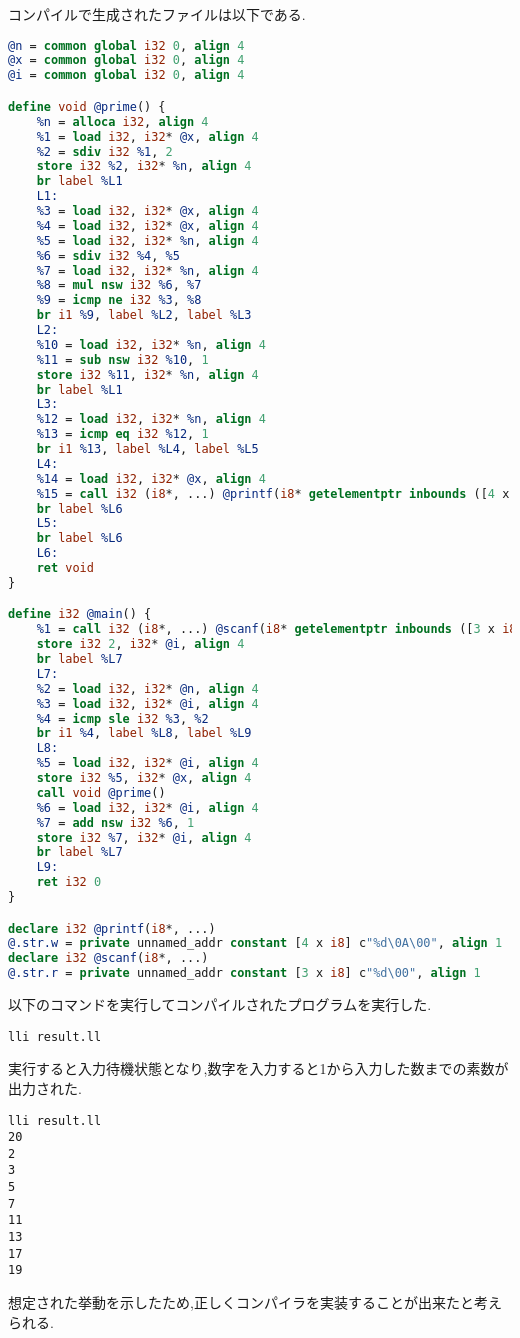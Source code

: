 \documentclass[main]{subfiles}
\begin{document}
コンパイルで生成されたファイルは以下である.
\begin{lstlisting}[caption=pl0b.pのコンパイルで生成されたresult.ll,language=LLVM]
@n = common global i32 0, align 4
@x = common global i32 0, align 4
@i = common global i32 0, align 4

define void @prime() {
    %n = alloca i32, align 4
    %1 = load i32, i32* @x, align 4
    %2 = sdiv i32 %1, 2
    store i32 %2, i32* %n, align 4
    br label %L1
    L1:
    %3 = load i32, i32* @x, align 4
    %4 = load i32, i32* @x, align 4
    %5 = load i32, i32* %n, align 4
    %6 = sdiv i32 %4, %5
    %7 = load i32, i32* %n, align 4
    %8 = mul nsw i32 %6, %7
    %9 = icmp ne i32 %3, %8
    br i1 %9, label %L2, label %L3
    L2:
    %10 = load i32, i32* %n, align 4
    %11 = sub nsw i32 %10, 1
    store i32 %11, i32* %n, align 4
    br label %L1
    L3:
    %12 = load i32, i32* %n, align 4
    %13 = icmp eq i32 %12, 1
    br i1 %13, label %L4, label %L5
    L4:
    %14 = load i32, i32* @x, align 4
    %15 = call i32 (i8*, ...) @printf(i8* getelementptr inbounds ([4 x i8], [4 x i8]* @.str.w, i64 0, i64 0), i32 %14)
    br label %L6
    L5:
    br label %L6
    L6:
    ret void
}

define i32 @main() {
    %1 = call i32 (i8*, ...) @scanf(i8* getelementptr inbounds ([3 x i8], [3 x i8]* @.str.r, i64 0, i64 0), i32* @n)
    store i32 2, i32* @i, align 4
    br label %L7
    L7:
    %2 = load i32, i32* @n, align 4
    %3 = load i32, i32* @i, align 4
    %4 = icmp sle i32 %3, %2
    br i1 %4, label %L8, label %L9
    L8:
    %5 = load i32, i32* @i, align 4
    store i32 %5, i32* @x, align 4
    call void @prime()
    %6 = load i32, i32* @i, align 4
    %7 = add nsw i32 %6, 1
    store i32 %7, i32* @i, align 4
    br label %L7
    L9:
    ret i32 0
}

declare i32 @printf(i8*, ...)
@.str.w = private unnamed_addr constant [4 x i8] c"%d\0A\00", align 1
declare i32 @scanf(i8*, ...)
@.str.r = private unnamed_addr constant [3 x i8] c"%d\00", align 1
\end{lstlisting}
以下のコマンドを実行してコンパイルされたプログラムを実行した.
\begin{oframed}
\begin{verbatim}
lli result.ll
\end{verbatim}
\end{oframed}
実行すると入力待機状態となり,数字を入力すると1から入力した数までの素数が出力された.
\begin{lstlisting}[caption=pl0b.pをコンパイルしたプログラムを実行]
lli result.ll
20
2
3
5
7
11
13
17
19
\end{lstlisting}
想定された挙動を示したため,正しくコンパイラを実装することが出来たと考えられる.
\end{document}
